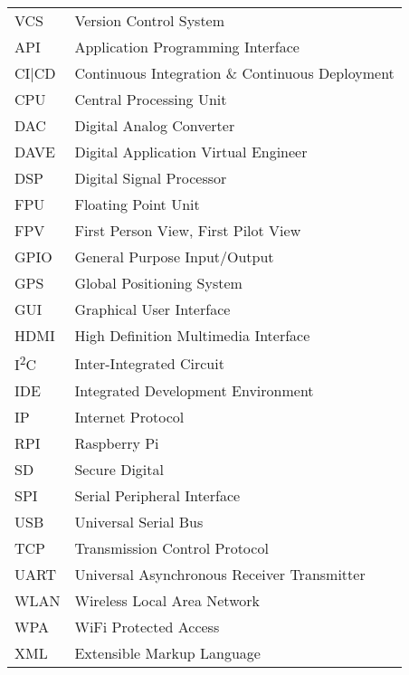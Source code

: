\begin{singlespace}
\begin{flushleft}
\begin{longtable}{p{2 cm}p{14 cm}}
  VCS & Version Control System \\
  API & Application Programming Interface \\
  CI|CD & Continuous Integration \& Continuous Deployment \\
  CPU & Central Processing Unit \\
  DAC & Digital Analog Converter \\
  DAVE & Digital Application Virtual Engineer \\
  DSP & Digital Signal Processor \\
  FPU & Floating Point Unit \\
  FPV & First Person View, First Pilot View \\
  GPIO & General Purpose Input/Output \\
  GPS & Global Positioning System \\
  GUI & Graphical User Interface \\	
  HDMI & High Definition Multimedia Interface \\
  I\textsuperscript{2}C & Inter-Integrated Circuit \\
  IDE & Integrated Development Environment \\
  IP & Internet Protocol \\
  RPI & Raspberry Pi \\
  SD & Secure Digital \\
  SPI & Serial Peripheral Interface \\
  USB & Universal Serial Bus \\
  TCP & Transmission Control Protocol \\
  UART & Universal Asynchronous Receiver Transmitter \\
  WLAN & Wireless Local Area Network \\
  WPA & WiFi Protected Access \\
  XML & Extensible Markup Language \\
\end{longtable}
\end{flushleft}
\end{singlespace}
